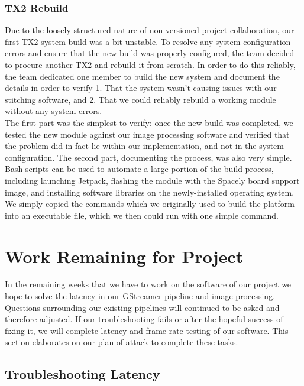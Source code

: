 \documentclass[letterpaper,10pt,serif,draftclsnofoot,onecolumn,compsoc,titlepage]{IEEEtran}
\begin{document}
\subsubsection{TX2 Rebuild}

Due to the loosely structured nature of non-versioned project collaboration, our 
first TX2 system build was a bit unstable. To resolve any system configuration errors 
and ensure that the new build was properly configured, the team decided to procure 
another TX2 and rebuild it from scratch. In order to do this reliably, the team 
dedicated one member to build the new system and document the details in order to 
verify 1. That the system wasn't causing issues with our stitching software, and 2. 
That we could reliably rebuild a working module without any system errors.\\

The first part was the simplest to verify: once the new build was completed, we 
tested the new module against our image processing software and verified that the 
problem did in fact lie within our implementation, and not in the system 
configuration. The second part, documenting the process, was also very simple. Bash 
scripts can be used to automate a large portion of the build process, including 
launching Jetpack, flashing the module with the Spacely board support image, and 
installing software libraries on the newly-installed operating system. We simply 
copied the commands which we originally used to build the platform into an executable 
file, which we then could run with one simple command.\\

\section{Work Remaining for Project}

In the remaining weeks that we have to work on the software of our project we hope to 
solve the latency in our GStreamer pipeline and image processing. Questions surrounding 
our existing pipelines will continued to be asked and therefore adjusted. If our 
troubleshooting fails or after the hopeful success of fixing it, we will complete latency 
and frame rate testing of our software. This section elaborates on our plan of attack to 
complete these tasks.\\

\subsection{Troubleshooting Latency}
\end{document}
